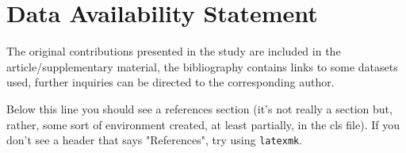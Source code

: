 \documentclass[utf8]{my_class_1_front_vanc}  %
\begin{document}


\section*{Data Availability Statement}

The original contributions presented in the study are included in the article/supplementary
material, the bibliography contains links to some datasets used, further inquiries can be directed
to the corresponding author.

Below this line you should see a references section (it's not really a section but, rather, some
sort of environment created, at least partially, in the cls file). If you don't see a header that
says "References", try using {\tt latexmk}.


%  


 



\end{document}
